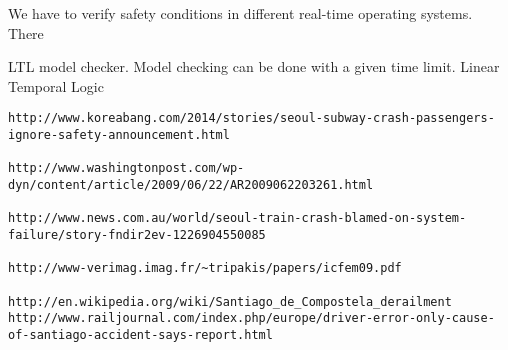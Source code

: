 \documentclass[a4paper,11pt]{report}
\begin{document}
We have to verify safety conditions in different real-time operating systems. There

LTL model checker. Model checking can be done with a given time limit. Linear Temporal Logic

\newpage
\begin{verbatim}
http://www.koreabang.com/2014/stories/seoul-subway-crash-passengers-ignore-safety-announcement.html

http://www.washingtonpost.com/wp-dyn/content/article/2009/06/22/AR2009062203261.html

http://www.news.com.au/world/seoul-train-crash-blamed-on-system-failure/story-fndir2ev-1226904550085

http://www-verimag.imag.fr/~tripakis/papers/icfem09.pdf

http://en.wikipedia.org/wiki/Santiago_de_Compostela_derailment
http://www.railjournal.com/index.php/europe/driver-error-only-cause-of-santiago-accident-says-report.html
\end{verbatim}
\fi
\end{document}
